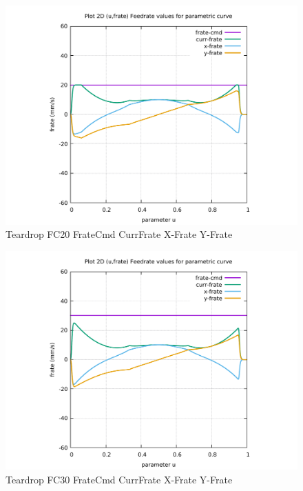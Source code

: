 \begin{figure}
	\caption     {Teardrop FC20 FrateCmd CurrFrate X-Frate Y-Frate}
	\label{28-img-Teardrop-FC20-FrateCmd-CurrFrate-X-Frate-Y-Frate.pdf}
	\includegraphics[width=1.00\textwidth]{Chap4/appendix/app-Teardrop/plots/28-img-Teardrop-FC20-FrateCmd-CurrFrate-X-Frate-Y-Frate.pdf}
\end{figure}


\clearpage
\pagebreak

\begin{figure}
	\caption     {Teardrop FC30 FrateCmd CurrFrate X-Frate Y-Frate}
	\label{29-img-Teardrop-FC30-FrateCmd-CurrFrate-X-Frate-Y-Frate.pdf}
	\includegraphics[width=1.00\textwidth]{Chap4/appendix/app-Teardrop/plots/29-img-Teardrop-FC30-FrateCmd-CurrFrate-X-Frate-Y-Frate.pdf}
\end{figure}


